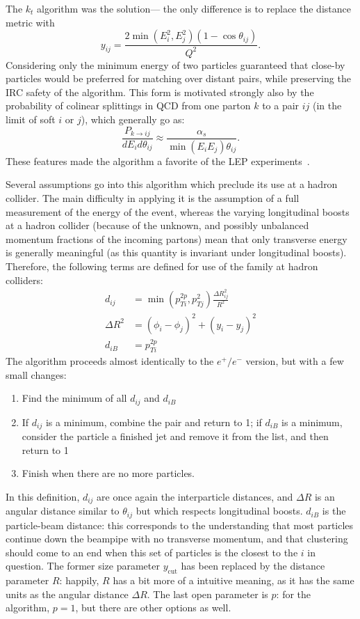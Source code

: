 The $k_t$ algorithm was the solution--- the only difference is to replace the distance metric with
%
\begin{equation}
y_{ij} = \frac{2 \min(E_i^2,E_j^2) (1-\cos{\theta_{ij}})}{Q^2}.
\end{equation}
%
Considering only the minimum energy of two particles guaranteed that close-by particles would be preferred for matching over distant pairs, while preserving the IRC safety of the algorithm. This form is motivated strongly also by the probability of colinear splittings in QCD from one parton $k$ to a pair $ij$ (in the limit of soft $i$ or $j$), which generally go as:
%
\begin{equation}
\frac{P_{k\rightarrow ij}}{dE_i d\theta_{ij}} \approx \frac{\alpha_s}{\min(E_i E_j) \theta_{ij}}.
\end{equation}
%
These features made the \kt algorithm a favorite of the LEP experiments~\cite{Jetography}.

Several assumptions go into this algorithm which preclude its use at a hadron collider. The main difficulty in applying it is the assumption of a full measurement of the energy of the event, whereas the varying longitudinal boosts at a hadron collider (because of the unknown, and possibly unbalanced momentum fractions of the incoming partons) mean that only transverse energy is generally meaningful (as this quantity is invariant under longitudinal boosts). Therefore, the following terms are defined for use of the \kt family at hadron colliders:
%
\begin{align}
d_{ij} &= \min(p_{Ti}^{2p}, p_{Tj}^{2}) \frac{\Delta R_{ij}^2}{R^2} \nonumber\\
\Delta R^2 &= (\phi_i - \phi_j)^2 + (y_i - y_j)^2\nonumber\\
d_{iB} &= p_{Ti}^{2p}
\end{align}
%
The algorithm proceeds almost identically to the $e^+/e^-$ version, but with a few small changes:
%
\begin{enumerate}
\item Find the minimum of all $d_{ij}$ and $d_{iB}$
\item If $d_{ij}$ is a minimum, combine the pair and return to 1; if $d_{iB}$ is a minimum, consider the particle a finished jet and remove it from the list, and then return to 1
\item Finish when there are no more particles.
\end{enumerate}
%
In this definition, $d_{ij}$ are once again the interparticle distances, and $\Delta R$ is an angular distance similar to $\theta_{ij}$ but which respects longitudinal boosts. $d_{iB}$ is the particle-beam distance: this corresponds to the understanding that most particles continue down the beampipe with no transverse momentum, and that clustering should come to an end when this set of particles is the closest to the $i$ in question. The former size parameter $y_\mathrm{cut}$ has been replaced by the distance parameter $R$: happily, $R$ has a bit more of a intuitive meaning, as it has the same units as the angular distance $\Delta R$. The last open parameter is $p$: for the \kt algorithm, $p=1$, but there are other options as well.

